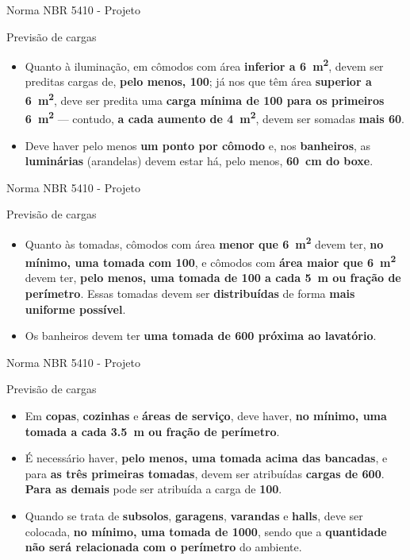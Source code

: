 \begin{frame}{Norma NBR 5410 - Projeto}
	\begin{block}{Previsão de cargas}
		\begin{itemize}
			\item Quanto à iluminação, em cômodos com área \textbf{inferior a \SI{6}{\meter\squared}}, devem ser preditas cargas de, \textbf{pelo menos, \SI{100}{\va}}; já nos que têm área \textbf{superior a \SI{6}{\meter\squared}}, deve ser predita uma \textbf{carga mínima de \SI{100}{\va} para os primeiros \SI{6}{\meter\squared}} — contudo, \textbf{a cada aumento de \SI{4}{\meter\squared}}, devem ser somadas \textbf{mais \SI{60}{\va}}.
			\item Deve haver pelo menos \textbf{um ponto por cômodo} e, nos \textbf{banheiros}, as \textbf{luminárias} (arandelas) devem estar há, pelo menos, \textbf{\SI{60}{\centi\meter} do boxe}.
		\end{itemize}
	\end{block}
\end{frame}


\begin{frame}{Norma NBR 5410 - Projeto}
	\begin{block}{Previsão de cargas}
		\begin{itemize}
			\item Quanto às tomadas, cômodos com área \textbf{menor que \SI{6}{\meter\squared}} devem ter, \textbf{no mínimo, uma tomada com \SI{100}{\va}}, e cômodos com \textbf{área maior que \SI{6}{\meter\squared}} devem ter, \textbf{pelo menos, uma tomada de \SI{100}{\va} a cada \SI{5}{\meter} ou fração de perímetro}. Essas tomadas devem ser \textbf{distribuídas} de forma \textbf{mais uniforme possível}.
			\item Os banheiros devem ter \textbf{uma tomada de \SI{600}{\va} próxima ao lavatório}.
		\end{itemize}
	\end{block}
\end{frame}


\begin{frame}{Norma NBR 5410 - Projeto}
	\begin{block}{Previsão de cargas}
		\begin{itemize}
			\item Em \textbf{copas}, \textbf{cozinhas} e \textbf{áreas de serviço}, deve haver, \textbf{no mínimo, uma tomada a cada \SI{3.5}{\meter} ou fração de perímetro}.
			\item É necessário haver, \textbf{pelo menos, uma tomada acima das bancadas}, e para \textbf{as três primeiras tomadas}, devem ser atribuídas \textbf{cargas de \SI{600}{\va}}. \textbf{Para as demais} pode ser atribuída a carga de \textbf{\SI{100}{\va}}.
			\item Quando se trata de \textbf{subsolos}, \textbf{garagens}, \textbf{varandas} e \textbf{halls}, deve ser colocada, \textbf{no mínimo, uma tomada de \SI{1000}{\va}}, sendo que a \textbf{quantidade não será relacionada com o perímetro} do ambiente.
		\end{itemize}
	\end{block}
\end{frame}


